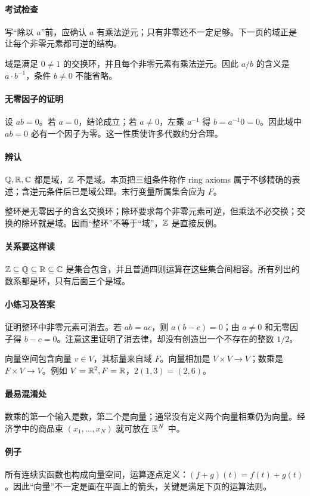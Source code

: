 \paragraph{考试检查}写“除以 $a$”前，应确认 $a$ 有乘法逆元；只有非零还不一定足够。下一页的域正是让每个非零元素都可逆的结构。

域是满足 $0\ne1$ 的交换环，并且每个非零元素有乘法逆元。因此 $a/b$ 的含义是 $a\cdot b^{-1}$，条件 $b\ne0$ 不能省略。
\paragraph{无零因子的证明}设 $ab=0$。若 $a=0$，结论成立；若 $a\ne0$，左乘 $a^{-1}$ 得 $b=a^{-1}0=0$。因此域中 $ab=0$ 必有一个因子为零。这一性质使许多代数约分合理。
\paragraph{辨认}$\mathbb{Q},\mathbb{R},\mathbb C$ 都是域，$\mathbb{Z}$ 不是域。本页把三组条件称作 ring axioms 属于不够精确的表述；含逆元条件后已是域公理。末行变量所属集合应为 $F$。

整环是无零因子的含幺交换环；除环要求每个非零元素可逆，但乘法不必交换；交换的除环就是域。因而“整环”不等于“域”，$\mathbb{Z}$ 是直接反例。
\paragraph{关系要这样读}$\mathbb{Z}\subseteq\mathbb{Q}\subseteq\mathbb{R}\subseteq\mathbb C$ 是集合包含，并且普通四则运算在这些集合间相容。所有列出的数系都是环，只有后面三个是域。
\paragraph{小练习及答案}证明整环中非零元素可消去。若 $ab=ac$，则 $a(b-c)=0$；由 $a\ne0$ 和无零因子得 $b-c=0$。注意这里证明了消去律，却没有创造出一个不存在的整数 $1/2$。

向量空间包含向量 $v\in V$，其标量来自域 $F$。向量相加是 $V\times V\to V$；数乘是 $F\times V\to V$。例如 $V=\mathbb{R}^2,F=\mathbb{R}$，$2(1,3)=(2,6)$。
\paragraph{最易混淆处}数乘的第一个输入是数，第二个是向量；通常没有定义两个向量相乘仍为向量。经济学中的商品束 $(x_1,\ldots,x_N)$ 就可放在 $\mathbb{R}^N$ 中。
\paragraph{例子}所有连续实函数也构成向量空间，运算逐点定义：$(f+g)(t)=f(t)+g(t)$。因此“向量”不一定是画在平面上的箭头，关键是满足下页的运算法则。

